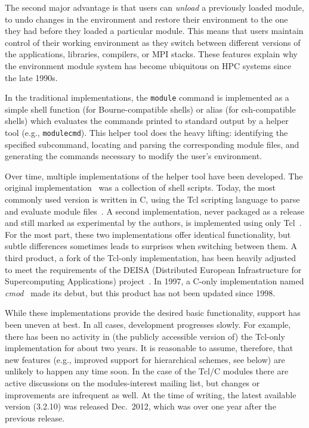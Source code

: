 \noindent
The second major advantage is that users can \emph{unload} a previously
loaded module, to undo changes in the environment and restore their
environment to the one they had before they loaded a particular module.  This means
that users maintain control of their working environment as they switch between
different versions of the applications, libraries, compilers, or MPI stacks.  These features explain why the environment module
system has become ubiquitous on HPC systems since the late 1990s.


%

In the traditional implementations, the \texttt{\small module} command
is implemented as a simple shell function (for Bourne-compatible shells) or
alias (for csh-compatible shells) which evaluates the commands printed to standard output by a
helper tool (e.g., \texttt{\small modulecmd}). This helper tool
does the heavy lifting: identifying the specified subcommand,
locating and parsing the corresponding module files, and generating the
commands necessary to modify the user's environment.

Over time, multiple implementations of the helper tool
have been developed. The original implementation~\cite{furlani91} was a collection
of shell scripts. Today, the most commonly used version is written in C, using
the Tcl scripting language to parse and evaluate module files~\cite{em}. A second
implementation, never packaged as a release and still marked as
experimental by the authors, is implemented using only Tcl~\cite{em}. For the most
part, these two implementations
offer identical functionality, but subtle differences sometimes leads to surprises when switching between them. A third product,
a
fork of the Tcl-only implementation, has been heavily adjusted to meet
the requirements of the DEISA (Distributed European Infrastructure for
Supercomputing Applications) project~\cite{wikiDEISA}.  In
1997, a C-only implementation named \emph{cmod}~\cite{cmod} made its debut, but this product has not been updated since 1998.



While these implementations provide the desired basic functionality, support has been uneven at best. In all cases, development
progresses slowly. For example, there has been no activity in
(the publicly accessible version of) the Tcl-only
implementation for about two years. It is reasonable to assume, therefore, that new features (e.g., improved support for hierarchical schemes, see below) are
unlikely to happen any time soon. In the case of the Tcl/C modules
there are active discussions on the modules-interest mailing list, but
changes or improvements are infrequent as well. At the time of writing, the
latest available version (3.2.10) was released Dec.~2012, which was over one year
after the previous release.

